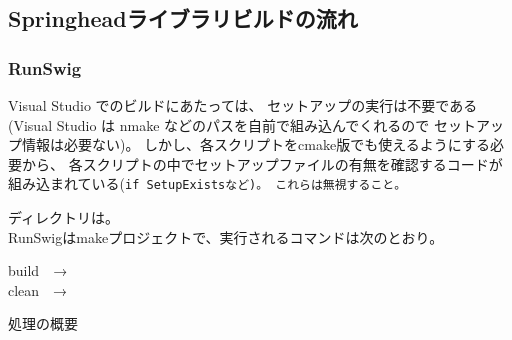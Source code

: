 
\subsection{Springheadライブラリビルドの流れ}
\label{subsec:AboutBuildingLibrary}

\subsubsection{RunSwig}
\label{subsubsec:RunSwig}
\begin{narrow}[s]
	Visual Studio でのビルドにあたっては、
	セットアップの実行は不要である
	(Visual Studio は nmake などのパスを自前で組み込んでくれるので
	セットアップ情報は必要ない)。
	しかし、各スクリプトをcmake版でも使えるようにする必要から、
	各スクリプトの中でセットアップファイルの有無を確認するコードが
	組み込まれている(\tt{if SetupExists}など)。
	これらは無視すること。
\end{narrow}
\medskip
ディレクトリは。\\
RunSwigはmakeプロジェクトで、実行されるコマンドは次のとおり。
\begin{narrow}
	build　→　\\
  	clean　→　
\end{narrow}
			
\medskip
処理の概要

